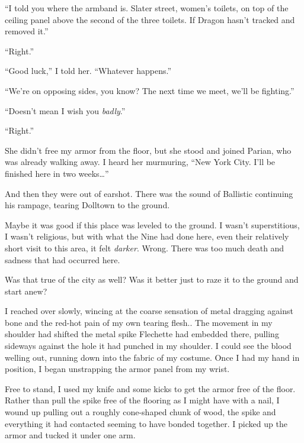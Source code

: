 ``I told you where the armband is.  Slater street, women's toilets, on top of the ceiling panel above the second of the three toilets.  If Dragon hasn't tracked and removed it.''



``Right.''



``Good luck,'' I told her.  ``Whatever happens.''



``We're on opposing sides, you know?  The next time we meet, we'll be fighting.''



``Doesn't mean I wish you \emph{badly}.''



``Right.''



She didn't free my armor from the floor, but she stood and joined Parian, who was already walking away.  I heard her murmuring, ``\ldotsto New York City.  I'll be finished here in two weeks\ldots''



And then they were out of earshot.  There was the sound of Ballistic continuing his rampage, tearing Dolltown to the ground.



Maybe it was good if this place was leveled to the ground.  I wasn't superstitious, I wasn't religious, but with what the Nine had done here, even their relatively short visit to this area, it felt \emph{darker}.  Wrong.  There was too much death and sadness that had occurred here.



Was that true of the city as well?  Was it better just to raze it to the ground and start anew?



I reached over slowly, wincing at the coarse sensation of metal dragging against bone and the red-hot pain of my own tearing flesh..  The movement in my shoulder had shifted the metal spike Flechette had embedded there, pulling sideways against the hole it had punched in my shoulder. I could see the blood welling out, running down into the fabric of my costume.  Once I had my hand in position, I began unstrapping the armor panel from my wrist.



Free to stand, I used my knife and some kicks to get the armor free of the floor.  Rather than pull the spike free of the flooring as I might have with a nail, I wound up pulling out a roughly cone-shaped chunk of wood, the spike and everything it had contacted seeming to have bonded together.  I picked up the armor and tucked it under one arm.



